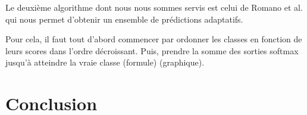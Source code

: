 \documentclass[a4paper,12pt]{article}
\begin{document}
\vspace{0.2cm}

Le deuxième algorithme dont nous nous sommes servis est celui de Romano et al. qui nous permet d'obtenir un ensemble de prédictions adaptatifs. 

Pour cela, il faut tout d'abord commencer par ordonner les classes en fonction de leurs scores dans l'ordre décroissant. Puis, prendre la somme des sorties softmax jusqu'à atteindre la vraie classe (formule) (graphique).



\section{Conclusion}



\printbibliography
\end{document}
